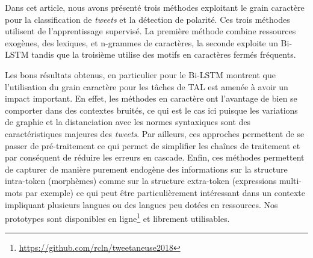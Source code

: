\label{sec:conclusion}
Dans cet article, nous avons présenté trois méthodes exploitant le grain caractère pour la classification de \textit{tweets} et la détection de polarité.
Ces trois méthodes utilisent de l'apprentissage supervisé.
La première méthode combine ressources exogènes, des lexiques, et n-grammes de caractères, la seconde exploite un Bi-LSTM tandis que la troisième utilise des motifs en caractères fermés fréquents.

Les bons résultats obtenus, en particulier pour le Bi-LSTM montrent que l'utilisation du grain caractère pour les tâches de TAL est amenée à avoir un impact important.
En effet, les méthodes en caractère ont l'avantage de bien se comporter dans des contextes bruités, ce qui est le cas ici puisque les variations de graphie et la distanciation avec les normes syntaxiques sont des caractéristiques majeures des \textit{tweets}.
Par ailleurs, ces approches permettent de se passer de pré-traitement ce qui permet de simplifier les chaînes de traitement et par conséquent de réduire les erreurs en cascade\cite{Lejeune-2014}.
Enfin, ces méthodes permettent de capturer de manière purement endogène des informations sur la structure intra-token (morphèmes) comme sur la structure extra-token (expressions multi-mots par exemple) ce qui peut être particulièrement intéressant dans un contexte impliquant plusieurs langues ou des langues peu dotées en ressources.
Nos prototypes sont disponibles en ligne\footnote{\url{https://github.com/rcln/tweetaneuse2018}} et librement utilisables.


